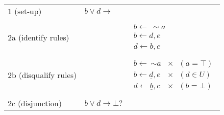 \documentclass[9pt,a4paper,landscape]{article}
\begin{document}
{\begin{center}
\begin{tabular}{p{3cm}p{5cm}p{6cm}}
		1 (set-up) & $b \lor d \rightarrow$ & \\ & \\
		2a (identify rules) &  & $\begin{array}{l}
		b \leftarrow\ \sim a\\
		b \leftarrow d, e\\
		d \leftarrow b, c
		\end{array}$  \\ & \\
		2b (disqualify rules) &  & $\begin{array}{ll}
		b \leftarrow\ \underline{\sim a} & \times \hspace{8pt} (a = \top) \\
		b \leftarrow \underline{d}, e & \times \hspace{8pt} (d \in U) \\
		d \leftarrow \underline{b}, c & \times \hspace{8pt} (b = \bot) 
		\end{array}$  \\ & \\
		2c (disjunction) & $b \lor d \rightarrow \bot ?$ \\ \midrule

\end{tabular}
\end{center}}
\end{document}
